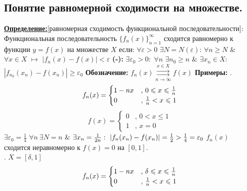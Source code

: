 \documentclass[a4paper,12pt]{article} %
\renewcommand {\geq}{\geqslant}
\renewcommand {\leq}{\leqslant}
\begin{document}
\subsection{Понятие равномерной сходимости на множестве.}
\underline{\textbf{Определение:}}[равномерная сходимость функциональной последовательности]:\newline
Функциональная последовательность $\{f_n(x)\}_{n=1}^\infty$ сходится равномерно к функции $y=f(x)$ на множестве $X$ если: \newline \newline
$\forall \varepsilon > 0 $  $\exists N = N(\varepsilon)$: $\forall n \geq N$  $\&$  $\forall x \in X$ $\longmapsto$ $|f_n(x) -f(x)| < \varepsilon$
\newline \newline
\hspace*{5mm} \noindent \textbf{(-):} $\exists \varepsilon_0>0:$ $\forall n$  $\exists n_0 \geq n$  $\&$  $\exists x_n \in X:$ $|f_{n_0}(x_n)-f(x_n)| \geq \varepsilon_0$ 
\newline \newline
\noindent \textbf{Обозначение:} $f_n(x) \overset{x \in X}{\underset{n \rightarrow \infty}{\rightrightarrows}} f(x)$
\noindent \textbf{Примеры:} .
\begin{equation*}
	f_n(x) = 
	\begin{cases}
		1-nx &\text{, $0 \leq x \leq {1 \over n}$}\\
		0 &\text{, ${1\over n}< x\leq 1$}
	\end{cases}
\end{equation*}
\begin{equation*}
	f(x) = 
	\begin{cases}
		0 &\text{, $0 < x \leqslant {1}$}\\
		1 &\text{, $x = 0$}
	\end{cases}
\end{equation*}
$\exists \varepsilon_0 = \frac{1}{4}$  $\forall n ~\exists N = n$ $\&$ $\exists x_n = {1\over 2n}: ~|f_n(x_n) - f(x_n)| = \frac{1}{2} > \frac{1}{4} = \varepsilon_0$
$f_n(x)$ сходится неравномерно к $f(x) = 0$ на $[0, 1]$.\\
. $X = [\delta, 1]$\\
\begin{equation*}
	f_n(x) = 
	\begin{cases}
		1-nx &\text{, $\delta \leq x \leq {1 \over n}$}\\
		0 &\text{, ${1\over n}< x\leq 1$}
	\end{cases}
\end{equation*}
\end{document}
